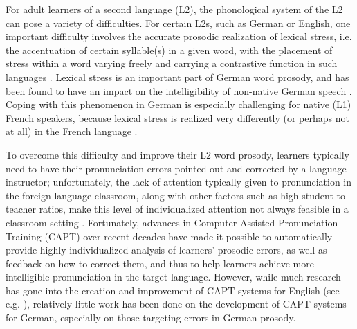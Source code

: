 \documentclass[a4paper]{article}
\begin{document}
    
  
  
  For adult learners of a second language (L2), the phonological system of the L2 can pose a variety of difficulties. For certain L2s, such as German or English, one important difficulty involves the accurate prosodic realization of lexical stress, i.e. the accentuation of certain syllable(s) in a given word, with the placement of stress within a word varying freely and carrying a contrastive function in such languages \cite{Cutler2005}. Lexical stress is an important part of German word prosody, and has been found to have an impact on the intelligibility of non-native German speech \cite{Hirschfeld1994}. Coping with this phenomenon in German is especially challenging for native (L1) French speakers, because lexical stress is realized very differently (or perhaps not at all) in the French language \cite{Dupoux2008,Michaux2013}.
  
  To overcome this difficulty and improve their L2 word prosody, learners typically need to have their pronunciation errors pointed out and corrected by a language instructor; unfortunately, the lack of attention typically given to pronunciation in the foreign language classroom, 
  along with other factors such as high student-to-teacher ratios,
  make this level of individualized attention not always feasible in a classroom setting \cite{Neri2002,Derwing2005,Hirschfeld2007}. Fortunately, advances in Computer-Assisted Pronunciation Training (CAPT) over recent decades have made it possible to automatically provide highly individualized analysis of learners' prosodic errors, as well as feedback on how to correct them, and thus to help learners achieve more intelligible pronunciation in the target language. However, while much research has gone into the creation and improvement of CAPT systems for English (see e.g. \cite{Eskenazi2009,Witt2012}), relatively little work has been done on the development of CAPT systems for German, especially on those targeting errors in German prosody.
  
\end{document}
